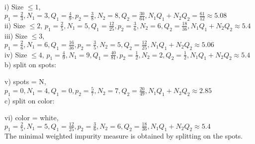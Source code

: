 \documentclass{article}
\begin{document}
i) Size $\leq 1$, 
$p_1 = \frac{2}{3} ,N_1 = 3,Q_1 = \frac{4}{9},  p_2 = \frac{3}{8},N_2 = 8, Q_2= \frac{30}{64}, N_1Q_1 + N_2Q_2 = \frac{61}{12} \approx 5.08$\\
ii) Size $\leq 2$,
$p_1 = \frac{2}{5} ,N_1 = 5,Q_1 = \frac{12}{25},  p_2 = \frac{3}{6},N_2 = 6, Q_2= \frac{18}{36}, N_1Q_1 + N_2Q_2  \approx 5.4$\\
iii) Size $\leq 3$,
$p_1 = \frac{2}{6} ,N_1 = 6,Q_1 = \frac{16}{36},  p_2 = \frac{3}{5},N_2 = 5, Q_2= \frac{12}{25}, N_1Q_1 + N_2Q_2  \approx 5.06$\\
iv) Size $\leq 4$,
$p_1 = \frac{4}{9} ,N_1 = 9,Q_1 = \frac{40}{81},  p_2 = \frac{1}{2},N_2 = 2, Q_2= \frac{1}{2}, N_1Q_1 + N_2Q_2  \approx 5.4$\\

b) split on spots:

v)  spots = N,
$p_1 = 0 ,N_1 = 4,Q_1 = 0,  p_2 = \frac{5}{7},N_2 = 7, Q_2= \frac{20}{49}, N_1Q_1 + N_2Q_2  \approx 2.85$\\

c) split on color:

vi) color = white,
$p_1 = \frac{2}{5} ,N_1 = 5,Q_1 = \frac{12}{25},  p_2 = \frac{3}{6},N_2 = 6, Q_2= \frac{18}{36}, N_1Q_1 + N_2Q_2  \approx 5.4$ \\
The minimal weighted impurity measure is obtained by splitting on the spots.  \\


\begin{center}
\end{center}
\end{document}
